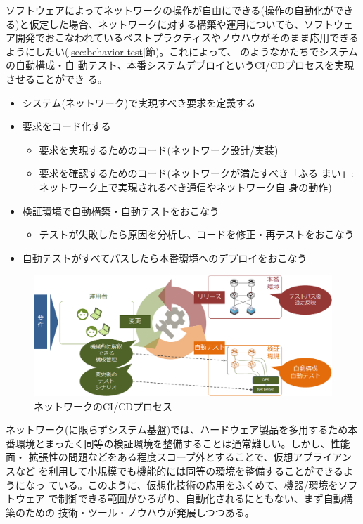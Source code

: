 ソフトウェアによってネットワークの操作が自由にできる(操作の自動化ができ
る)と仮定した場合、ネットワークに対する構築や運用についても、ソフトウェ
ア開発でおこなわれているベストプラクティスやノウハウがそのまま応用できる
ようにしたい(\ref{sec:behavior-test}節)。これによって、
のようなかたちでシステムの自動構成・自
動テスト、本番システムデプロイというCI/CDプロセスを実現させることができ
る。
\begin{itemize}
 \item システム(ネットワーク)で実現すべき要求を定義する
 \item 要求をコード化する
       \begin{itemize}
        \item 要求を実現するためのコード(ネットワーク設計/実装)
        \item 要求を確認するためのコード(ネットワークが満たすべき「ふる
              まい」: ネットワーク上で実現されるべき通信やネットワーク自
              身の動作)
       \end{itemize}
 \item 検証環境で自動構築・自動テストをおこなう
       \begin{itemize}
        \item テストが失敗したら原因を分析し、コードを修正・再テストをおこなう
       \end{itemize}
 \item 自動テストがすべてパスしたら本番環境へのデプロイをおこなう
\end{itemize}

\begin{figure}[h]
 \centering
 \includegraphics[scale=0.5]{img/desired-cicd-process.png}
 \caption{ネットワークのCI/CDプロセス}
 \label{fig:desired-cicd-process}
\end{figure}

ネットワーク(に限らずシステム基盤)では、ハードウェア製品を多用するため本
番環境とまったく同等の検証環境を整備することは通常難しい。しかし、性能面・
拡張性の問題などをある程度スコープ外とすることで、仮想アプライアンスなど
を利用して小規模でも機能的には同等の環境を整備することができるようになっ
ている。このように、仮想化技術の応用をふくめて、機器/環境をソフトウェア
で制御できる範囲がひろがり、自動化されるにともない、まず自動構築のための
技術・ツール・ノウハウが発展しつつある。

